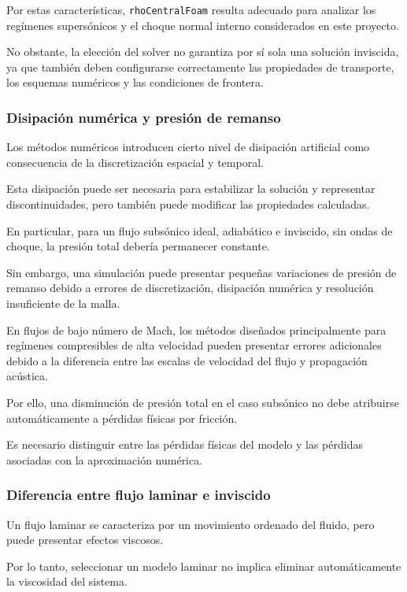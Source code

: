 \documentclass[12pt,letterpaper]{article}
\numberwithin{equation}{section}
\begin{document}
Por estas características,
\texttt{rhoCentralFoam} resulta
adecuado para analizar los
regímenes supersónicos y el
choque normal interno considerados
en este proyecto.

No obstante, la elección del
solver no garantiza por sí sola
una solución inviscida, ya que
también deben configurarse
correctamente las propiedades
de transporte, los esquemas
numéricos y las condiciones
de frontera.


\subsubsection{Disipación numérica
y presión de remanso}

Los métodos numéricos introducen
cierto nivel de disipación artificial
como consecuencia de la discretización
espacial y temporal.

Esta disipación puede ser necesaria
para estabilizar la solución y
representar discontinuidades,
pero también puede modificar
las propiedades calculadas.

En particular, para un flujo
subsónico ideal, adiabático
e inviscido, sin ondas de choque,
la presión total debería
permanecer constante.

Sin embargo, una simulación
puede presentar pequeñas
variaciones de presión de remanso
debido a errores de discretización,
disipación numérica y resolución
insuficiente de la malla.

En flujos de bajo número de Mach,
los métodos diseñados principalmente
para regímenes compresibles de
alta velocidad pueden presentar
errores adicionales debido a
la diferencia entre las escalas
de velocidad del flujo y
propagación acústica.

Por ello, una disminución de
presión total en el caso subsónico
no debe atribuirse automáticamente
a pérdidas físicas por fricción.

Es necesario distinguir entre
las pérdidas físicas del modelo
y las pérdidas asociadas con
la aproximación numérica.


\subsubsection{Diferencia entre
flujo laminar e inviscido}

Un flujo laminar se caracteriza
por un movimiento ordenado del
fluido, pero puede presentar
efectos viscosos.

Por lo tanto, seleccionar un
modelo laminar no implica
eliminar automáticamente la
viscosidad del sistema.
\end{document}
